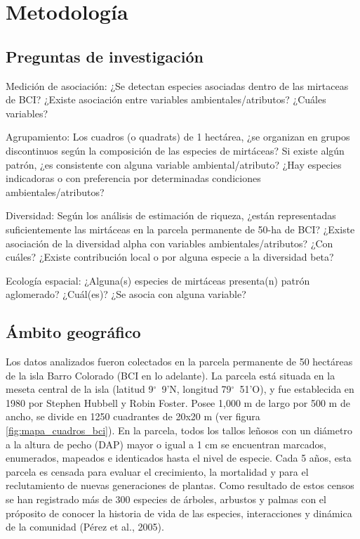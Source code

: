 \documentclass[11pt,]{article}
\begin{document}
\section{Metodología}\label{metodologuxeda}

\subsection{Preguntas de
investigación}\label{preguntas-de-investigaciuxf3n}

Medición de asociación: ¿Se detectan especies asociadas dentro de las
mirtaceas de BCI? ¿Existe asociación entre variables
ambientales/atributos? ¿Cuáles variables?

Agrupamiento: Los cuadros (o quadrats) de 1 hectárea, ¿se organizan en
grupos discontinuos según la composición de las especies de mirtáceas?
Si existe algún patrón, ¿es consistente con alguna variable
ambiental/atributo? ¿Hay especies indicadoras o con preferencia por
determinadas condiciones ambientales/atributos?

Diversidad: Según los análisis de estimación de riqueza, ¿están
representadas suficientemente las mirtáceas en la parcela permanente de
50-ha de BCI? ¿Existe asociación de la diversidad alpha con variables
ambientales/atributos? ¿Con cuáles? ¿Existe contribución local o por
alguna especie a la diversidad beta?

Ecología espacial: ¿Alguna(s) especies de mirtáceas presenta(n) patrón
aglomerado? ¿Cuál(es)? ¿Se asocia con alguna variable?

\subsection{Ámbito geográfico}\label{uxe1mbito-geogruxe1fico}

Los datos analizados fueron colectados en la parcela permanente de 50
hectáreas de la isla Barro Colorado (BCI en lo adelante). La parcela
está situada en la meseta central de la isla (latitud 9\(^\circ\)~9'N,
longitud 79\(^\circ\)~51'O), y fue establecida en 1980 por Stephen
Hubbell y Robin Foster. Posee 1,000 m de largo por 500 m de ancho, se
divide en 1250 cuadrantes de 20x20 m (ver figura
\ref{fig:mapa_cuadros_bci}). En la parcela, todos los tallos leñosos con
un diámetro a la altura de pecho (DAP) mayor o igual a 1 cm se
encuentran marcados, enumerados, mapeados e identicados hasta el nivel
de especie. Cada 5 años, esta parcela es censada para evaluar el
crecimiento, la mortalidad y para el reclutamiento de nuevas
generaciones de plantas. Como resultado de estos censos se han
registrado más de 300 especies de árboles, arbustos y palmas con el
próposito de conocer la historia de vida de las especies, interacciones
y dinámica de la comunidad (Pérez et al., 2005).
\end{document}
